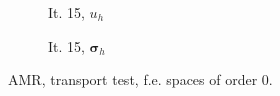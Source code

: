 \documentclass[a4paper,12pt]{amsart}
\numberwithin{equation}{section}
\def\bsigma{{\boldsymbol \sigma}}
\begin{document}
\begin{figure}[h!]
\begin{subfigure}[t]{0.35\textwidth}
	\caption{It. 15, $u_h$}
\end{subfigure}
	\hfill
\begin{subfigure}[t]{0.35\textwidth}
	\caption{It. 15, $\bsigma_h$}
\end{subfigure}

\caption{AMR, transport test, f.e. spaces of order 0.}
\label{fig:amr_transp_feorder0}
\end{figure}
\end{document}
